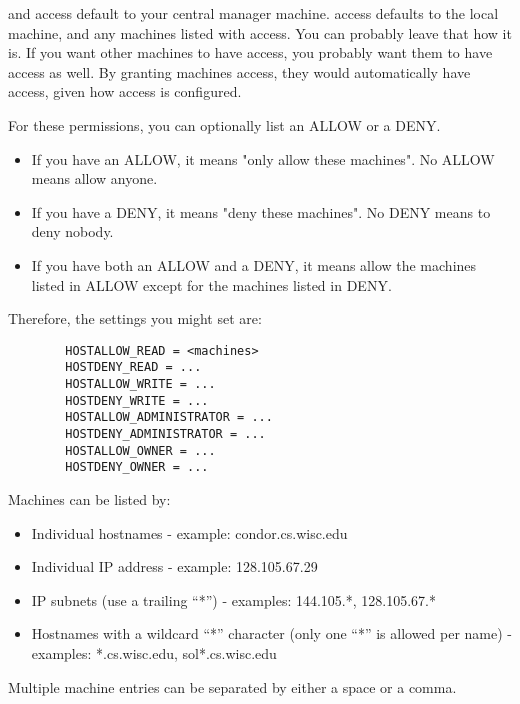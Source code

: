  and  access default to 
your central manager machine.
 access defaults to the local machine, and any machines
listed with  access.  You can probably leave
that how it is.  If you want other machines to have 
access, you probably want them to have  access
as well.  By granting machines  access, they
would automatically have  access, given how
 access is configured.

For these permissions, you can optionally list an ALLOW or a DENY.
\begin{itemize}

\item If you have an ALLOW, it means "only allow these machines".  No
    ALLOW means allow anyone.

\item If you have a DENY, it means "deny these machines".  No DENY
    means to deny nobody.

\item If you have both an ALLOW and a DENY, it means allow the
    machines listed in ALLOW except for the machines listed in DENY.
\end{itemize}

Therefore, the settings you might set are:
\begin{verbatim}
        HOSTALLOW_READ = <machines>
        HOSTDENY_READ = ...
        HOSTALLOW_WRITE = ...
        HOSTDENY_WRITE = ...
        HOSTALLOW_ADMINISTRATOR = ...
        HOSTDENY_ADMINISTRATOR = ...
        HOSTALLOW_OWNER = ...
        HOSTDENY_OWNER = ...
\end{verbatim}

Machines can be listed by:

\begin{itemize}
\item Individual hostnames - example: condor.cs.wisc.edu
\item Individual IP address - example: 128.105.67.29
\item IP subnets (use a trailing ``*'') - examples: 144.105.*, 128.105.67.*
\item Hostnames with a wildcard ``*'' character (only one ``*'' is
    allowed per name) - examples: *.cs.wisc.edu, sol*.cs.wisc.edu
\end{itemize}

Multiple machine entries can be separated by either a space or a comma.

